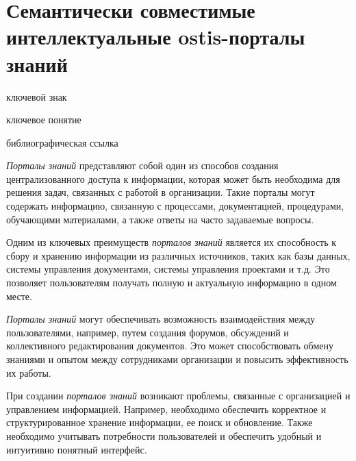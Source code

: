 \section{Семантически совместимые интеллектуальные ostis-порталы знаний}
{\label{sec_ostis_scientific_portal}} 

\begin{SCn}

\bigskip

\begin{scnrelfromlist}{ключевой знак}
\end{scnrelfromlist}

\begin{scnrelfromlist}{ключевое понятие}
\end{scnrelfromlist}


\begin{scnrelfromlist}{библиографическая ссылка}
\end{scnrelfromlist}

\end{SCn}

\textit{Порталы знаний} представляют собой один из способов создания централизованного доступа к информации, которая может быть необходима для решения задач, связанных с работой в организации. Такие порталы могут содержать информацию, связанную с процессами, документацией, процедурами, обучающими материалами, а также ответы на часто задаваемые вопросы.

Одним из ключевых преимуществ \textit{порталов знаний} является их способность к сбору и хранению информации из различных источников, таких как базы данных, системы управления документами, системы управления проектами и т.д. Это позволяет пользователям получать полную и актуальную информацию в одном месте.

\textit{Порталы знаний} могут обеспечивать возможность взаимодействия между пользователями, например, путем создания форумов, обсуждений и коллективного редактирования документов. Это может способствовать обмену знаниями и опытом между сотрудниками организации и повысить эффективность их работы.

При создании \textit{порталов знаний} возникают проблемы, связанные с организацией и управлением информацией. Например, необходимо обеспечить корректное и структурированное хранение информации, ее поиск и обновление. Также необходимо учитывать потребности пользователей и обеспечить удобный и интуитивно понятный интерфейс.

